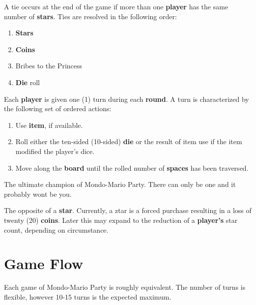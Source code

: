 \documentclass{article}
\begin{document}
\begin{description}[style=nextline]
\item[Tie] A tie occurs at the end of the game if more than one \textbf{player}
has the same number of \textbf{stars}.  Ties are resolved in the following order:
\begin{enumerate}
\item \textbf{Stars}
\item \textbf{Coins}
\item Bribes to the Princess
\item \textbf{Die} roll
\end{enumerate}

\item[Turn] Each \textbf{player} is given one (1) turn during each \textbf{round}.
A turn is characterized by the following set of ordered actions:
\begin{enumerate}
\item Use \textbf{item}, if available.
\item Roll either the ten-sided (10-sided) \textbf{die} or the result of
item use if the item modified the player's dice.
\item Move along the \textbf{board} until the rolled number of \textbf{spaces}
has been traversed.
\end{enumerate}

\item[Winner] The ultimate champion of Mondo-Mario Party.  There can only be one
and it probably wont be you.

\item[Ztar] The opposite of a \textbf{star}.  Currently, a ztar is a forced purchase
resulting in a loss of twenty (20) \textbf{coins}.  Later this may expand to the
reduction of a \textbf{player's} star count, depending on circumstance.

\end{description}

\section{Game Flow}

Each game of Mondo-Mario Party is roughly equivalent.  The number of
turns is flexible, however 10-15 turns is the expected maximum.
\end{document}
